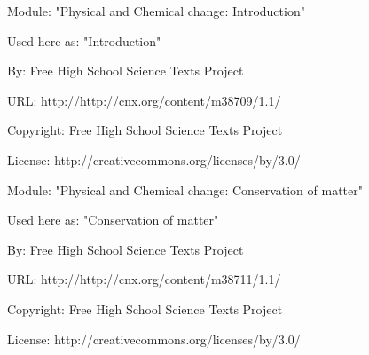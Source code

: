       \par\vspace{9pt}\noindent\begin{minipage}{\textwidth}
      Module: "Physical and Chemical change: Introduction" \par\nopagebreak\noindent
      Used here as: "Introduction" \par\nopagebreak\noindent
        By: Free High School Science Texts Project\par\nopagebreak\noindent
      URL: http://http://cnx.org/content/m38709/1.1/\par\nopagebreak\noindent
      \par\nopagebreak\noindent
      Copyright: Free High School Science Texts Project\par\nopagebreak\noindent
      License:  http://creativecommons.org/licenses/by/3.0/\par\nopagebreak\noindent
      \par\end{minipage}
      \par\vspace{9pt}\noindent\begin{minipage}{\textwidth}
      Module: "Physical and Chemical change: Conservation of matter" \par\nopagebreak\noindent
      Used here as: "Conservation of matter" \par\nopagebreak\noindent
        By: Free High School Science Texts Project\par\nopagebreak\noindent
      URL: http://http://cnx.org/content/m38711/1.1/\par\nopagebreak\noindent
      \par\nopagebreak\noindent
      Copyright: Free High School Science Texts Project\par\nopagebreak\noindent
      License:  http://creativecommons.org/licenses/by/3.0/\par\nopagebreak\noindent
      \par\end{minipage}
